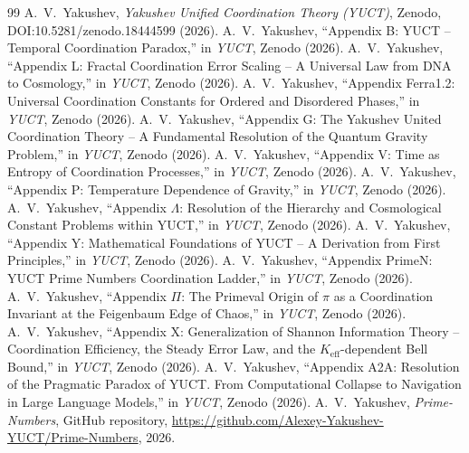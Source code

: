 \documentclass[12pt,a4paper]{article}
\theoremstyle{remark}
\begin{document}
	\begin{thebibliography}{99}
		 A.~V.~Yakushev, \emph{Yakushev Unified Coordination
			Theory (YUCT)}, Zenodo, DOI:10.5281/zenodo.18444599 (2026).
		 A.~V.~Yakushev, ``Appendix B: YUCT -- Temporal
		Coordination Paradox,'' in \emph{YUCT}, Zenodo (2026).
		 A.~V.~Yakushev, ``Appendix L: Fractal Coordination Error
		Scaling -- A Universal Law from DNA to Cosmology,'' in \emph{YUCT}, Zenodo (2026).
		 A.~V.~Yakushev, ``Appendix Ferra1.2: Universal
		Coordination Constants for Ordered and Disordered Phases,'' in \emph{YUCT},
		Zenodo (2026).
		 A.~V.~Yakushev, ``Appendix G: The Yakushev United
		Coordination Theory -- A Fundamental Resolution of the Quantum Gravity Problem,''
		in \emph{YUCT}, Zenodo (2026).
		 A.~V.~Yakushev, ``Appendix V: Time as Entropy of
		Coordination Processes,'' in \emph{YUCT}, Zenodo (2026).
		 A.~V.~Yakushev, ``Appendix P: Temperature Dependence of
		Gravity,'' in \emph{YUCT}, Zenodo (2026).
		 A.~V.~Yakushev, ``Appendix \(\Lambda\): Resolution of
		the Hierarchy and Cosmological Constant Problems within YUCT,'' in \emph{YUCT},
		Zenodo (2026).
		 A.~V.~Yakushev, ``Appendix Y: Mathematical Foundations of
		YUCT -- A Derivation from First Principles,'' in \emph{YUCT}, Zenodo (2026).
		 A.~V.~Yakushev, ``Appendix PrimeN: YUCT Prime Numbers 
		Coordination Ladder,'' in \emph{YUCT}, Zenodo (2026).
		 A.~V.~Yakushev, ``Appendix \(\Pi\): The Primeval Origin 
		of \(\pi\) as a Coordination Invariant at the Feigenbaum Edge of Chaos,''
		in \emph{YUCT}, Zenodo (2026).
		 A.~V.~Yakushev, ``Appendix X: Generalization of Shannon 
		Information Theory -- Coordination Efficiency, the Steady Error Law, 
		and the \(K_{\mathrm{eff}}\)-dependent Bell Bound,'' in \emph{YUCT}, Zenodo (2026).
		 A.~V.~Yakushev, ``Appendix A2A: Resolution of the 
		Pragmatic Paradox of YUCT. From Computational Collapse to Navigation 
		in Large Language Models,'' in \emph{YUCT}, Zenodo (2026).
		 A.~V.~Yakushev, \emph{Prime-Numbers}, GitHub repository, 
		\url{https://github.com/Alexey-Yakushev-YUCT/Prime-Numbers}, 2026.
	\end{thebibliography}
	
\end{document}
